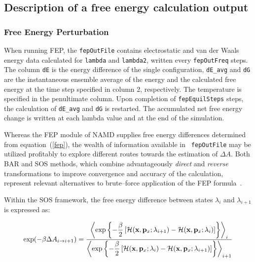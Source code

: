 \subsection{Description of a free energy calculation output }


\subsubsection{Free Energy Perturbation }


When running FEP, the {\tt fepOutFile} contains electrostatic and van der Waals energy
data calculated for {\tt lambda} and {\tt lambda2}, written every
{\tt fepOutFreq} steps. The column {\tt dE} is the energy
difference of the single configuration, {\tt dE\_avg} and {\tt dG}
are the instantaneous ensemble average of the energy and the calculated
free energy at the time step specified in column 2, respectively.
The temperature is specified in the penultimate column. Upon completion
of {\tt fepEquilSteps} steps, the calculation of {\tt dE\_avg} and
{\tt dG} is restarted. The accumulated net free energy change is written
at each lambda value and at the end of the simulation.


Whereas the FEP module of NAMD supplies free energy differences determined from
equation~({\ref{fep}}), the wealth of information available in {\tt
fepOutFile} may be utilized profitably to explore different routes towards the
estimation of $\Delta A$. Both BAR and SOS methods, which combine
advantageously \emph{direct} and \emph{reverse} transformations to improve
convergence and accuracy of the calculation, represent relevant alternatives to
brute--force application of the FEP formula~\cite{Lu2004}.


Within the SOS framework, the free energy difference between states $\lambda_i$ and
$\lambda_{i+1}$ is expressed as:


\begin{equation}
\exp(-\beta \Delta A_{i \rightarrow i+1})  =
\frac{\displaystyle
      \left\langle \exp\left\{-\frac{\beta}{2}
                       \left[
                       {\cal H}({\bf x}, {\bf p}_x; \lambda_{i+1}) - {\cal H}({\bf x}, {\bf p}_x; \lambda_i)
                       \right]
                       \right\}
      \right\rangle_i}
      {\displaystyle
       \left\langle \exp\left\{-\frac{\beta}{2}
                       \left[
                       {\cal H}({\bf x}, {\bf p}_x; \lambda_i) - {\cal H}({\bf x}, {\bf p}_x; \lambda_{i+1})
                       \right]
                       \right\}
      \right\rangle_{i+1}}
\label{sos}
\end{equation}

